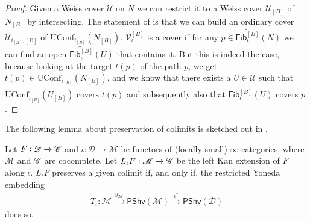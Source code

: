 \documentclass[../text.tex]{subfiles}
\begin{document}
\begin{proof}
    Given a Weiss cover $\mathscr{U}$ on $N$ we can restrict it to a Weiss cover $\mathscr{U}_{[B]}$ of $N_{[B]}$ by intersecting. The statement of  is that we can build an ordinary cover $\mathscr{U}_{i_{[B]},[B]}$ of $\mathrm{UConf}_{i_{[B]}}(N_{[B]})$. $\mathscr{V}_{\iota}^{[B]}$ is a cover if for any $p \in \widetilde{\mathsf{Fib}_{\iota}^{[B]}}(N)$ we can find an open $\widetilde{\mathsf{Fib}_{\iota}^{[B]}}(U)$ that contains it. But this is indeed the case, because looking at the target $t(p)$ of the path $p$, we get $t(p) \in \mathrm{UConf}_{i_{[B]}}(N_{[B]})$, and we know that there exists a $U \in \mathscr{U}$ such that $\mathrm{UConf}_{i_{[B]}}(U_{[B]})$ covers $t(p)$ and subsequently also that $\widetilde{\mathsf{Fib}_{\iota}^{[B]}}(U)$ covers $p$.
\end{proof}


The following lemma about preservation of colimits is sketched out in \cite{rezk2023lan}.
%
\begin{lemma}\label{lem:Lan_preserve_colim}
    Let $F: \mathscr{D} \xrightarrow{} \mathscr{C}$ and $\iota: \mathscr{D} \xrightarrow{} \mathscr{M}$ be functors of (locally small) $\infty$-categories, where $\mathscr{M}$ and $\mathscr{C}$ are cocomplete. Let $L_{\iota} F: \mathscr{M} \xrightarrow{} \mathscr{C}$ be the left Kan extension of $F$ along $\iota$. $L_{\iota} F$ preserves a given colimit if, and only if, the restricted Yoneda embedding
    \begin{align}
        T_{\iota}: \mathscr{M} \xrightarrow{\ y_{\mathscr{M}} \ } \mathsf{PShv}(\mathscr{M}) \xrightarrow{\ \iota^* \ } \mathsf{PShv}(\mathscr{D}) 
    \end{align}
    does so.
\end{lemma}
\end{document}

